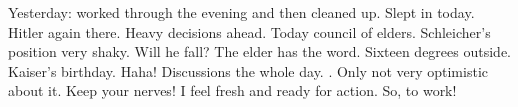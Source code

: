 Yesterday: worked through the evening and then cleaned up. Slept in today. Hitler again there. Heavy decisions ahead. Today council of elders. Schleicher's position very shaky. Will he fall? The elder has the word. Sixteen degrees outside. Kaiser's birthday. Haha! Discussions the whole day. . Only not very optimistic about it. Keep your nerves! I feel fresh and ready for action. So, to work!